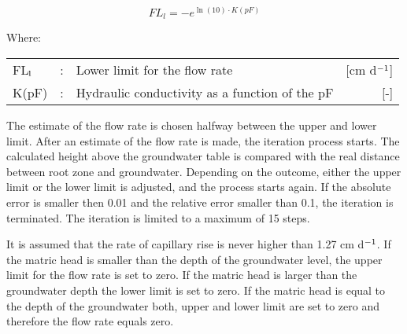 \begin{equation}
FL_{l} = - e^{\ln(10) \cdot K(pF)}
\end{equation}

Where:\\[5pt]
\begin{tabularx}{\textwidth}{llXr}
FL$_{{\rm l}}$ &:& Lower limit for the flow rate  & [cm d$^{{\rm -1}}$]\\
K(pF) &:& Hydraulic conductivity as a function of the pF  & [-]\\
\end{tabularx}

The estimate of the flow rate is chosen halfway between the upper and lower limit. After
an estimate of the flow rate is made, the iteration process starts. The calculated height
above the groundwater table is compared with the real distance between root zone and
groundwater. Depending on the outcome, either the upper limit or the lower limit is
adjusted, and the process starts again. If the absolute error is smaller then 0.01 and the
relative error smaller than 0.1, the iteration is terminated. The iteration is limited to a
maximum of 15 steps.

It is assumed that the rate of capillary rise is never higher than 1.27 cm d$^{{\rm -1}}$. If the matric
head is smaller than the depth of the groundwater level, the upper limit for the flow rate
is set to zero. If the matric head is larger than the groundwater depth the lower limit is
set to zero. If the matric head is equal to the depth of the groundwater both, upper and
lower limit are set to zero and therefore the flow rate equals zero.
